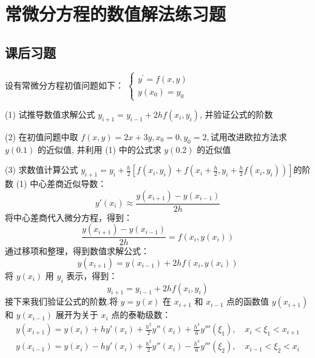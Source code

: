 \section{常微分方程的数值解法练习题}
\subsection{课后习题}
   \begin{tcolorbox}[breakable,enhanced,arc=0mm,outer arc=0mm,
		boxrule=0pt,toprule=1pt,leftrule=0pt,bottomrule=1pt, rightrule=0pt,left=0.2cm,right=0.2cm,
		titlerule=0.5em,toptitle=0.1cm,bottomtitle=-0.1cm,top=0.2cm,
		colframe=white!10!biru,colback=white!90!biru,coltitle=white,
            coltext=black,title =2024-04, title style={white!10!biru}, before skip=8pt, after skip=8pt,before upper=\hspace{2em},
		fonttitle=\bfseries,fontupper=\normalsize]

 设有常微分方程初值问题如下：
$
\left\{\begin{array}{c}
y^{\prime}=f(x, y) \\
y\left(x_{0}\right)=y_{0}
\end{array}\right.
$

(1) 试推导数值求解公式 $ y_{i+1}=y_{i-1}+2 hf\left(x_{i}, y_{i}\right) $, 并验证公式的阶数

(2) 在初值问题中取 $ f(x, y)=2 x+3 y, x_{0}=0, y_{0}=2, $试用改进欧拉方法求 $ y(0.1) $ 的近似值, 并利用 (1) 中的公式求 $ y(0.2) $ 的近似值

(3) 求数值计算公式
$y_{i+1}=y_{i}+\frac{h}{2}\left[f\left(x_{i}, y_{i}\right)+f\left(x_{i}+\frac{h}{2}, y_{i}+\frac{h}{2} f\left(x_{i}, y_{i}\right)\right)\right]$的阶数
\tcblower
(1) %
中心差商近似导数：
$$
y'(x_i) \approx \frac{y(x_{i+1}) - y(x_{i-1})}{2h}
$$
将中心差商代入微分方程，得到：
$$
\frac{y(x_{i+1}) - y(x_{i-1})}{2h} = f(x_i, y(x_i))
$$
通过移项和整理，得到数值求解公式：
$$
y(x_{i+1}) = y(x_{i-1}) + 2hf(x_i, y(x_i))
$$
将 $ y(x_i) $ 用 $ y_i $ 表示，得到：
$$
y_{i+1} = y_{i-1} + 2hf(x_i, y_i)
$$
接下来我们验证公式的阶数.将 $ y = y(x) $ 在 $ x_{i+1} $ 和 $ x_{i-1} $ 点的函数值 $ y(x_{i+1}) $ 和 $ y(x_{i-1}) $ 展开为关于 $ x_i $ 点的泰勒级数：
$$
\begin{array}{l}
y(x_{i+1}) = y(x_i) + hy'(x_i) + \frac{h^2}{2} y''(x_i) + \frac{h^3}{6} y'''(\xi_1), \quad x_i < \xi_1 < x_{i+1} \\
y(x_{i-1}) = y(x_i) - hy'(x_i) + \frac{h^2}{2} y''(x_i) - \frac{h^3}{6} y'''(\xi_2), \quad x_{i-1} < \xi_2 < x_i
\end{array}
$$


\end{tcolorbox}
